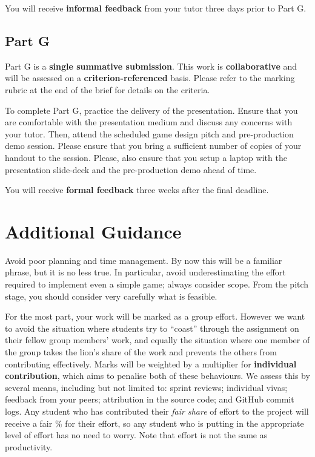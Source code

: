 \documentclass{../fal_assignment}
\begin{document}
You will receive \textbf{informal feedback} from your tutor three days prior to Part G.

\subsection*{Part G}

Part G is a \textbf{single summative submission}. This work is \textbf{collaborative} and will be assessed on a \textbf{criterion-referenced} basis. Please refer to the marking rubric at the end of the brief for details on the criteria.

To complete Part G, practice the delivery of the presentation. Ensure that you are comfortable with the presentation medium and discuss any concerns with your tutor. Then, attend the scheduled game design pitch and pre-production demo session. Please ensure that you bring a sufficient number of copies of your handout to the session. Please, also ensure that you setup a laptop with the presentation slide-deck and the pre-production demo ahead of time.

You will receive \textbf{formal feedback} three weeks after the final deadline.

\section*{Additional Guidance}

Avoid poor planning and time management. By now this will be a familiar phrase, but it is no less true.
In particular, avoid underestimating the effort required to implement even a simple game; always consider scope.
From the pitch stage, you should consider very carefully what is feasible.

For the most part, your work will be marked as a group effort.
However we want to avoid the situation where students try to ``coast'' through the assignment
on their fellow group members' work,
and equally the situation where one member of the group takes the lion's share of the work
and prevents the others from contributing effectively.
Marks will be weighted by a multiplier for \textbf{individual contribution},
which aims to penalise both of these behaviours.
We assess this by several means, including but not limited to: sprint reviews; individual vivas; feedback from your peers;
attribution in the source code; and GitHub commit logs.
Any student who has contributed their \textit{fair share} of effort to the project will receive a fair \% for their effort,
so any student who is putting in the appropriate level of effort has no need to worry.
Note that effort is not the same as productivity.
\end{document}
